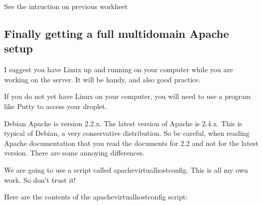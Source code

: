 \documentclass[12pt, a4paper]{article}
\begin{document}
See the intruction on previous workheet

\subsection*{Finally getting a full multidomain Apache setup}


I suggest you have Linux up and running on your computer while you are working on the server. It will be handy, and also good practice.

If you do not yet have Linux on your computer, you will need to use a program like Putty to access your droplet.

Debian Apache is version 2.2.x. The latest  version of Apache is 2.4.x. This is typical of Debian, a very conservative distribution. So be careful, when reading Apache documentation that you read the documents for 2.2 and not for the latest version. There are some annoying differences.

We are going to use a script called apachevirtualhostconfig. This is all my own work. So don’t trust it!

Here are the contents of the apachevirtualhostconfig script:
\end{document}
